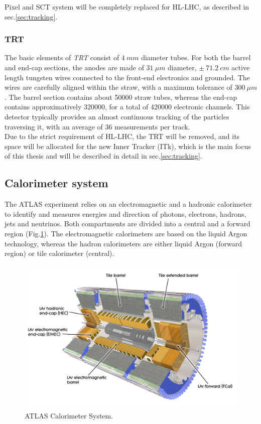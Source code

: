 \documentclass[a4paper,twoside,12pt]{article}
\begin{document}
Pixel and SCT system will be completely replaced for HL-LHC, as described in sec.\ref{sec:tracking}.

\subsubsection*{TRT}
The basic elements of \textit{TRT} consist of $4\ mm$ diameter tubes\cite{Aad:2008zzm}. For both the barrel
and end-cap sections, the anodes are made of $31\ \mu m$ diameter, $\pm\ 71.2\ cm$ 
active length tungsten wires 
connected to the front-end electronics and grounded. The wires are carefully aligned within
the straw, with a maximum tolerance of $300\ \mu m$. The barrel section contains about 
50000 straw tubes, whereas the end-cap contains approximatively 320000,
for a total of 420000 electronic channels\cite{ATLAS:1997ag}. This detector typically provides
an almost continuous tracking of the particles traversing it, with an average of 36 measurements per track.\\

Due to the strict requirement of HL-LHC, the TRT will be removed, and its space will be allocated for the new
Inner Tracker (ITk), which is the main focus of this thesis and will be described in detail in sec.\ref{sec:tracking}.

\subsection{Calorimeter system}

The ATLAS experiment  relies on an electromagnetic and a hadronic calorimeter to identify and measures energies and direction of photons, electrons, hadrons, jets and neutrinos. 
Both compartments are divided into a central and a forward region (Fig.\ref{fig:current_Cals}). The electromagnetic calorimeters are based on the liquid Argon technology,
whereas the hadron calorimeters are either liquid Argon (forward region) or tile calorimeter (central).\\

\begin{figure} [h]
	\includegraphics[width=\textwidth]{current_Cals}
	\caption{ATLAS Calorimeter System.}
	\label{fig:current_Cals}
\end{figure}
\end{document}
